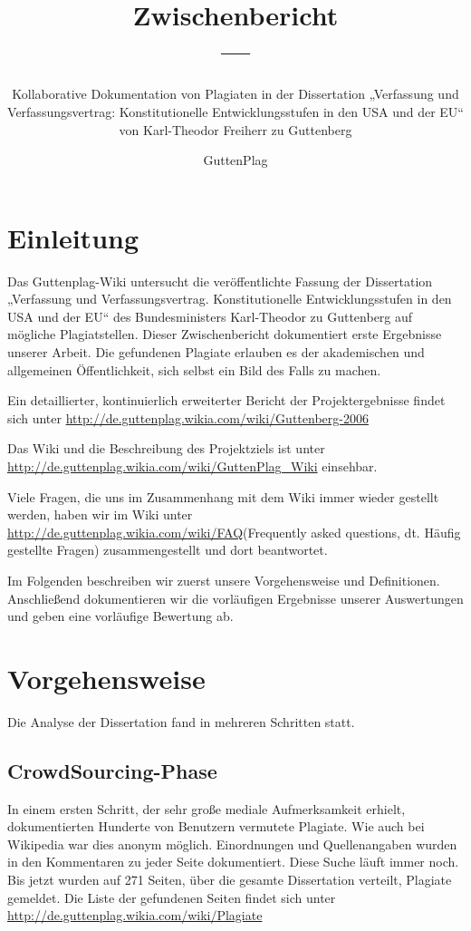 \documentclass[ngerman,final,fontsize=12pt,paper=a4,twoside,BCOR=8mm,draft=false]{scrartcl}
\author{GuttenPlag}
\title{Zwischenbericht \\ --- }
\subtitle {Kollaborative
  Dokumentation von Plagiaten in der Dissertation „Verfassung und
  Verfassungsvertrag: Konstitutionelle Entwicklungsstufen in den USA
  und der EU“ von Karl-Theodor Freiherr zu Guttenberg}
\begin{document}
\maketitle\thispagestyle{empty}
\tableofcontents
\newpage


\section{Einleitung}
Das Guttenplag-Wiki untersucht die veröffentlichte Fassung der Dissertation „Verfassung und Verfassungsvertrag. Konstitutionelle Entwicklungsstufen in den USA und der EU“ des Bundesministers Karl-Theodor zu Guttenberg auf mögliche Plagiatstellen.
Dieser Zwischenbericht dokumentiert erste Ergebnisse unserer Arbeit. Die gefundenen Plagiate erlauben es der akademischen und allgemeinen Öffentlichkeit, sich selbst ein Bild des Falls zu machen.

Ein detaillierter, kontinuierlich erweiterter Bericht der
Projektergebnisse findet sich unter
\url{http://de.guttenplag.wikia.com/wiki/Guttenberg-2006}

Das Wiki und die Beschreibung des Projektziels ist unter
\url{http://de.guttenplag.wikia.com/wiki/GuttenPlag\_Wiki} einsehbar.

Viele Fragen, die uns im Zusammenhang mit dem Wiki immer wieder
gestellt werden, haben wir im Wiki unter
\url{http://de.guttenplag.wikia.com/wiki/FAQ}(Frequently asked
questions, dt. Häufig gestellte Fragen) zusammengestellt und dort
beantwortet.

Im Folgenden beschreiben wir zuerst unsere Vorgehensweise und Definitionen. Anschließend dokumentieren wir die vorläufigen Ergebnisse unserer Auswertungen und geben eine vorläufige Bewertung ab.

\section{Vorgehensweise}
Die Analyse der Dissertation fand in mehreren Schritten statt.
\subsection{CrowdSourcing-Phase}
In einem ersten Schritt, der sehr große mediale Aufmerksamkeit erhielt, dokumentierten Hunderte von Benutzern vermutete Plagiate. Wie auch bei Wikipedia war dies anonym möglich. Einordnungen und Quellenangaben wurden in den Kommentaren zu jeder Seite dokumentiert. Diese Suche läuft immer noch. Bis jetzt wurden auf 271 Seiten, über die gesamte Dissertation verteilt, Plagiate gemeldet. Die Liste der gefundenen Seiten findet sich unter \url{http://de.guttenplag.wikia.com/wiki/Plagiate}
\end{document}
